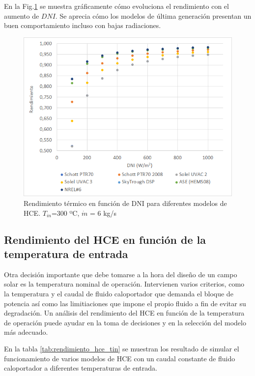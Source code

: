 En la Fig.\ref{fig:test1a} se muestra gráficamente cómo evoluciona el rendimiento con el aumento de $DNI$.  Se aprecia cómo los  modelos de última generación presentan un buen comportamiento incluso con bajas radiaciones.

\begin{figure}[h!]
\includegraphics[width=0.9\linewidth]{images/rendimiento_dni.png}
\caption{Rendimiento térmico en función de DNI para diferentes modelos de HCE. $T_{in}$=300 ºC, $\dot m$ = 6 kg/s} 
\label{fig:test1a}
\end{figure}


\subsection{Rendimiento del HCE en función de la temperatura de entrada}

Otra decisión importante que debe tomarse a la hora del diseño de  un campo solar es la temperatura nominal de operación. Intervienen varios criterios, como la temperatura y el caudal de fluido caloportador que demanda el bloque de potencia así como las limitiaciones que impone el propio fluido a fin de evitar su degradación.  Un análisis del rendimiento del HCE en función de la temperatura de operación puede ayudar en la toma de decisiones y  en la selección del modelo más adecuado.

En la tabla \ref{tab:rendimiento_hce_tin} se muestran los resultado de simular el funcionamiento de varios modelos de HCE con un caudal constante de fluido caloportador a diferentes temperaturas de entrada.

